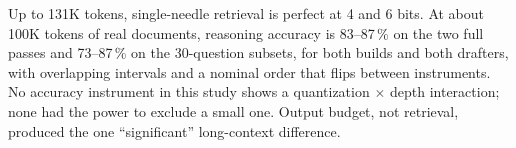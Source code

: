 \begin{takeaway}
Up to 131K tokens, single-needle retrieval is perfect at 4 and 6 bits. At about 100K tokens of real
documents, reasoning accuracy is 83--87\,\% on the two full passes and 73--87\,\% on the 30-question
subsets, for both builds and both drafters, with overlapping intervals and a nominal order that flips between instruments. No accuracy instrument in this study
shows a quantization $\times$ depth interaction; none had the power to exclude a small one. Output
budget, not retrieval, produced the one ``significant'' long-context difference.
\end{takeaway}
